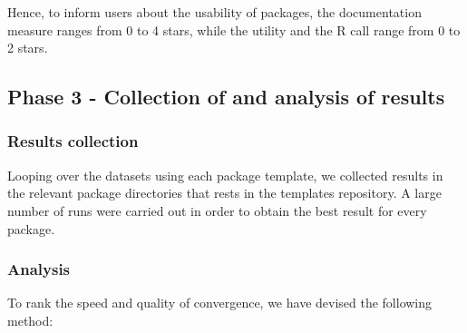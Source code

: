 Hence, to inform users about the usability of packages, the
documentation measure ranges from 0 to 4 stars, while the utility and
the R call range from 0 to 2 stars.

\hypertarget{phase-3---collection-of-and-analysis-of-results}{%
\subsection{Phase 3 - Collection of and analysis of
results}\label{phase-3---collection-of-and-analysis-of-results}}

\hypertarget{results-collection}{%
\subsubsection{Results collection}\label{results-collection}}

Looping over the datasets using each package template, we collected
results in the relevant package directories that rests in the templates
repository. A large number of runs were carried out in order to obtain
the best result for every package.

\hypertarget{analysis}{%
\subsubsection{Analysis}\label{analysis}}

To rank the speed and quality of convergence, we have devised the
following method:

